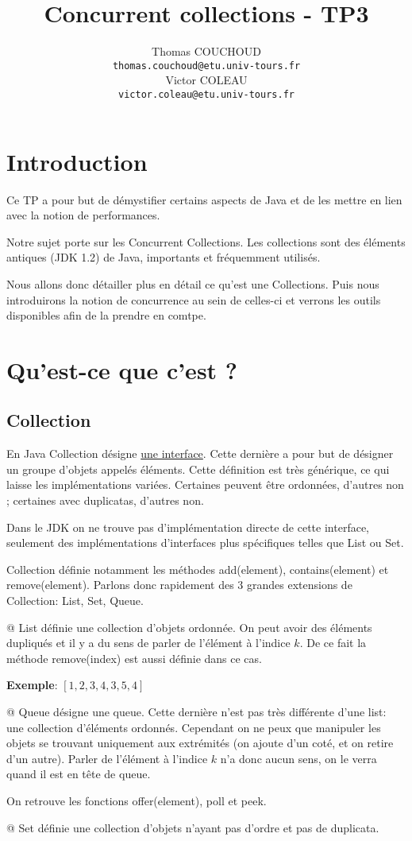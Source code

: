 \documentclass{report}
\title{Concurrent collections - TP3}
\author{Thomas COUCHOUD\\\texttt{thomas.couchoud@etu.univ-tours.fr}\\Victor COLEAU\\\texttt{victor.coleau@etu.univ-tours.fr}}
\begin{document}
	\mccTitle

	\chapter{Introduction}
		Ce TP a pour but de démystifier certains aspects de Java et de les mettre en lien avec la notion de performances.

		Notre sujet porte sur les Concurrent Collections. 
		Les collections sont des éléments antiques (JDK 1.2) de Java, importants et fréquemment utilisés.

		Nous allons donc détailler plus en détail ce qu'est une Collections.
		Puis nous introduirons la notion de concurrence au sein de celles-ci et verrons les outils disponibles afin de la prendre en comtpe.

	\chapter{Qu'est-ce que c'est ?}
		\section{Collection}
			En Java Collection désigne \href{https://docs.oracle.com/javase/8/docs/api/java/util/Collection.html}{une interface}.
			Cette dernière a pour but de désigner un groupe d'objets appelés éléments.
			Cette définition est très générique, ce qui laisse les implémentations variées.
			Certaines peuvent être ordonnées, d'autres non ; certaines avec duplicatas, d'autres non.
			
			Dans le JDK on ne trouve pas d'implémentation directe de cette interface, seulement des implémentations d'interfaces plus spécifiques telles que List ou Set.
			
			
			
			Collection définie notamment les méthodes add(element), contains(element) et remove(element).
			Parlons donc rapidement des 3 grandes extensions de Collection: List, Set, Queue.
			\begin{easylist}[itemize]
				@ List définie une collection d'objets ordonnée.
				On peut avoir des éléments dupliqués et il y a du sens de parler de l'élément à l'indice $k$.
				De ce fait la méthode remove(index) est aussi définie dans ce cas.
			
				\textbf{Exemple}: $\left[1,2,3,4,3,5,4\right]$
				
				@ Queue désigne une queue. Cette dernière n'est pas très différente d'une list: une collection d'éléments ordonnés.
				Cependant on ne peux que manipuler les objets se trouvant uniquement aux extrémités (on ajoute d'un coté, et on retire d'un autre).
				Parler de l'élément à l'indice $k$ n'a donc aucun sens, on le verra quand il est en tête de queue.
				
				On retrouve les fonctions offer(element), poll et peek.
				
				@ Set définie une collection d'objets n'ayant pas d'ordre et pas de duplicata.
			\end{easylist}
			
\end{document}

